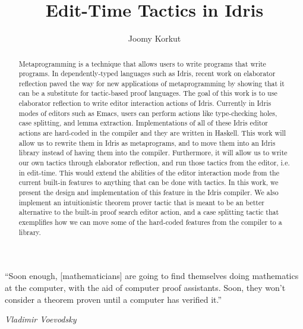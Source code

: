 \documentclass[11pt, ma]{westhesis}
\title{Edit-Time Tactics in Idris}
\author{Joomy Korkut}
\theoremstyle{plain}
\theoremstyle{definition}
\begin{document}
\begin{abstract}
  Metaprogramming is a technique that allows users to write programs that
  write programs. In dependently-typed languages such as Idris, recent work on
  elaborator reflection paved the way for new applications of metaprogramming
  by showing that it can be a substitute for tactic-based proof languages.
  The goal of this work is to use elaborator reflection to write editor
  interaction actions of Idris.
  Currently in Idris modes of editors such as Emacs, users can perform actions
  like type-checking holes, case splitting, and lemma extraction.
  Implementations of all of these Idris editor actions are hard-coded in the
  compiler and they are written in Haskell. This work will allow us to rewrite
  them in Idris as metaprograms, and to move them into an Idris library instead
  of having them into the compiler.
  Furthermore, it will allow us to write our own tactics through elaborator
  reflection, and run those tactics from the editor, i.e. in edit-time.
  This would extend the abilities of the editor interaction mode from the
  current built-in features to anything that can be done with tactics.
  In this work, we present the design and implementation of this feature in the
  Idris compiler.
  We also implement an intuitionistic theorem prover tactic that is meant to be an
  better alternative to the built-in proof search editor action, and a case
  splitting tactic that exemplifies how we can move some of the hard-coded
  features from the compiler to a library.
\end{abstract}

\begin{dedication}
  \epigraph{``Soon enough, [mathematicians] are going to find themselves doing mathematics at the computer, with the aid of computer proof assistants. Soon, they won’t consider a theorem proven until a computer has verified it.''}{\textit{Vladimir Voevodsky}\cite{voevodskyQuote}}
\end{dedication}
\end{document}
